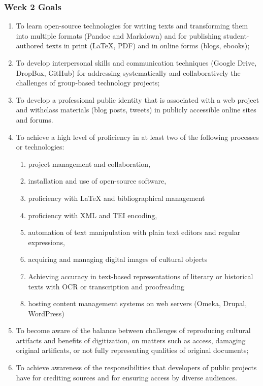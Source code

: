 \documentclass[]{article}
\begin{document}
\subsubsection{Week 2 Goals}\label{week-2-goals}

\begin{enumerate}
\def\labelenumi{\arabic{enumi}.}
\itemsep1pt\parskip0pt
\item
  To learn open-source technologies for writing texts and transforming
  them into multiple formats (Pandoc and Markdown) and for publishing
  student-authored texts in print (LaTeX, PDF) and in online forms
  (blogs, ebooks);
\item
  To develop interpersonal skills and communication techniques (Google
  Drive, DropBox, GitHub) for addressing systematically and
  collaboratively the challenges of group-based technology projects;
\item
  To develop a professional public identity that is associated with a
  web project and withclass materials (blog posts, tweets) in publicly
  accessible online sites and forums.
\item
  To achieve a high level of proficiency in at least two of the
  following processes or technologies:

  \begin{enumerate}
  \def\labelenumii{\Alph{enumii})}
  \itemsep1pt\parskip0pt
  \item
    project management and collaboration,
  \item
    installation and use of open-source software,
  \item
    proficiency with LaTeX and bibliographical management
  \item
    proficiency with XML and TEI encoding,
  \item
    automation of text manipulation with plain text editors and regular
    expressions,
  \item
    acquiring and managing digital images of cultural objects
  \item
    Achieving accuracy in text-based representations of literary or
    historical texts with OCR or transcription and proofreading
  \item
    hosting content management systems on web servers (Omeka, Drupal,
    WordPress)
  \end{enumerate}
\item
  To become aware of the balance between challenges of reproducing
  cultural artifacts and benefits of digitization, on matters such as
  access, damaging original artificats, or not fully representing
  qualities of original documents;
\item
  To achieve awareness of the responsibilities that developers of public
  projects have for crediting sources and for ensuring access by diverse
  audiences.
\end{enumerate}
\end{document}
